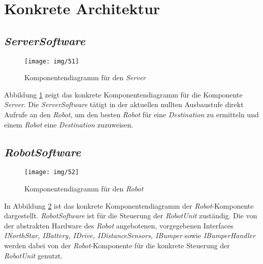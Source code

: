 \section{Konkrete Architektur}
\subsection{\textit{ServerSoftware}}
\begin{figure}[H]
\centering
\texttt{[image: img/51]}
\caption{Komponentendiagramm für den \emph{Server}}
\label{KomponentendiagrammKonkretServer}
\end{figure}
Abbildung \ref{KomponentendiagrammKonkretServer} zeigt das konkrete Komponentendiagramm für die Komponente \emph{Server}. Die \emph{ServerSoftware} tätigt in der aktuellen nullten Ausbaustufe direkt Aufrufe an den \textit{Robot}, 
um den besten \textit{Robot} für eine \textit{Destination} zu ermitteln und einem \textit{Robot} eine \textit{Destination} zuzuweisen.

\subsection{\textit{RobotSoftware}}
\begin{figure}[H]
	\centering
	\texttt{[image: img/52]}
	\caption{Komponentendiagramm für den \emph{Robot}}
	\label{KomponentendiagrammKonkretRobot}
\end{figure}
In Abbildung \ref{KomponentendiagrammKonkretRobot} ist das konkrete Komponentendiagramm der \emph{Robot}-Komponente dargestellt. \emph{RobotSoftware} ist für die Steuerung der \textit{RobotUnit} zuständig. Die von der abstrakten Hardware 
des \textit{Robot} angebotenen, vorgegebenen Interfaces \textit{INorthStar, IBattery, IDrive, IDistanceSensors, IBumper} sowie 
\textit{IBumperHandler} werden dabei von der \textit{Robot}-Komponente für die konkrete Steuerung der \textit{RobotUnit} genutzt.
